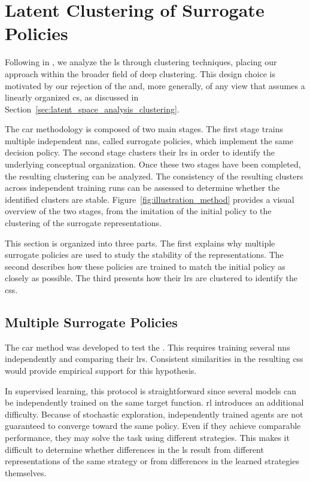 \section{Latent Clustering of Surrogate Policies}
\label{sec:clustering_agent_representations_latent_clustering_of_surrogate_policies}

Following \textcite{zahavy2017graying} in , we analyze the \gls{ls} through clustering techniques, placing our approach within the broader field of deep clustering.
This design choice is motivated by our rejection of the \SuperpositionHypothesisName and, more generally, of any view that assumes a linearly organized \gls{cs}, as discussed in Section~\ref{sec:latent_space_analysis_clustering}.

The \gls{car} methodology is composed of two main stages.
The first stage trains multiple independent \glspl{nn}, called surrogate policies, which implement the same decision policy.
The second stage clusters their \glspl{lr} in order to identify the underlying conceptual organization.
Once these two stages have been completed, the resulting clustering can be analyzed.
The consistency of the resulting clusters across independent training runs can be assessed to determine whether the identified clusters are stable.
Figure~\ref{fig:illustration_method} provides a visual overview of the two stages, from the imitation of the initial policy to the clustering of the surrogate representations.



This section is organized into three parts.
The first explains why multiple surrogate policies are used to study the stability of the representations.
The second describes how these policies are trained to match the initial policy as closely as possible.
The third presents how their \glspl{lr} are clustered to identify the \glspl{cs}.

\subsection{Multiple Surrogate Policies}

The \gls{car} method was developed to test the \RepresentationConvergenceHypothesisName.
This requires training several \glspl{nn} independently and comparing their \glspl{lr}.
Consistent similarities in the resulting \glspl{cs} would provide empirical support for this hypothesis.

In supervised learning, this protocol is straightforward since several models can be independently trained on the same target function.
\gls{rl} introduces an additional difficulty.
Because of stochastic exploration, independently trained agents are not guaranteed to converge toward the same policy.
Even if they achieve comparable performance, they may solve the task using different strategies.
This makes it difficult to determine whether differences in the \gls{ls} result from different representations of the same strategy or from differences in the learned strategies themselves.

